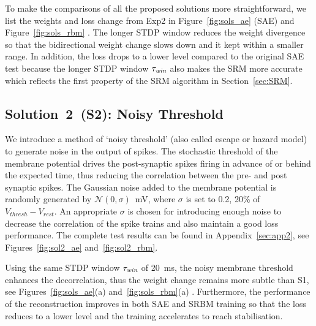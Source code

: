 To make the comparisons of all the proposed solutions more straightforward, we list the weights and loss change from Exp2 in Figure~\ref{fig:sols_ae} (SAE) and Figure~\ref{fig:sols_rbm} \DIFaddbegin {}\DIFaddend .
The longer STDP window reduces the weight divergence so that the bidirectional weight change slows down and it kept within a smaller range.
In addition, the loss drops to a lower level compared to the original SAE test because the longer STDP window $\tau_{\textit{\textrm{win}}}$ also makes the SRM more accurate which reflects the first property of the SRM algorithm in Section~\ref{sec:SRM}.



\subsection{Solution~2~(S2): Noisy Threshold}
We introduce a method of `noisy threshold' (also called escape or hazard model)~\citep{gerstner2002spiking} to generate noise in the output of spikes.
The stochastic threshold of the membrane potential drives the post-synaptic spikes firing in advance of or behind the expected time, thus reducing the correlation between the pre- and post synaptic spikes.
The Gaussian noise added to the membrane potential is randomly generated by $\mathcal{N}(0, \sigma)$~mV, where $\sigma$ is set to 0.2, 20\% of $V_{thresh} - V_{rest}.$
An appropriate $\sigma$ is chosen for introducing enough noise to decrease the correlation of the spike trains and also maintain a good loss performance.
The complete test results can be found in Appendix~\ref{sec:app2}, see Figures~\ref{fig:sol2_ae} and~\ref{fig:sol2_rbm}.

Using the same STDP window $\tau_{\textit{\textrm{win}}}$ of 20~ms, the noisy membrane threshold enhances the decorrelation, thus the weight change remains more subtle than S1, see Figures~\ref{fig:sols_ae}(a) and~\ref{fig:sols_rbm}(a) .
Furthermore, the performance of the reconstruction improves in both SAE and SRBM training so that the loss reduces to a lower level and the training accelerates to reach stabilisation. %


